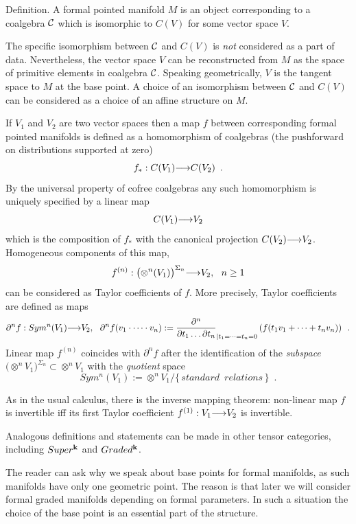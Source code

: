   \proclaim Definition. A formal pointed manifold $M$ is an
   object corresponding
   to a coalgebra ${\cal C}$ which is
   isomorphic to $C(V)$ for some vector space
    $V$.
   \par
   
   The specific isomorphism between ${\cal C}$
    and $C(V)$ is {\it not} considered as a part of data.
    Nevertheless, the vector space $V$ can be reconstructed from $M$
    as the space of primitive elements in coalgebra 
    ${\cal C}$.
      Speaking geometrically, $V$ is  the tangent space to $M$
     at the base point.
      A choice of an isomorphism between ${\cal C}$
    and $C(V)$ can be considered as a choice of an affine structure on $M$.
  
 If $V_1$ and $V_2$ are two vector spaces then a map $f$ between corresponding
  formal pointed manifolds is defined as a homomorphism of coalgebras
   (the pushforward on distributions supported at zero)
    $$f_*:C(V_1){\longrightarrow} C(V_2)\,\,\,.$$
    By the universal property of cofree coalgebras any such homomorphism
     is uniquely specified by a linear map
      $$C(V_1){\longrightarrow} V_2$$ 
      which is the composition of $f_*$ with the canonical projection
       $C(V_2){\longrightarrow} V_2$. Homogeneous components 
       of this map,
       $$f^{(n)}:
       \bigl(\otimes^n(V_1)\bigr)^{\Sigma_n}{\longrightarrow} V_2,\,\,\,\,n\ge 1$$
         can be considered
       as Taylor coefficients of $f$. More precisely, Taylor coefficients
        are defined as maps 
        $$\partial ^n f: Sym^n(V_1){\longrightarrow} V_2,
        \,\,\,\,\partial ^n f(v_1\cdot\dots\cdot v_n):=
        {{\partial}^n\over {\partial} t_1\dots {\partial} t_n}
    _{|t_1=\dots=t_n=0} \left(f(t_1 v_1+\dots+t_n v_n)\right)\,\,\,.$$
    Linear map $f^{(n)}$ coincides with $\partial ^n f$ after the
     identification of the {\it subspace}
      $\bigl( \otimes^n V_1\bigr)^{\Sigma_n}\subset \otimes^n V_1$ 
      with the {\it quotient} space 
      $$Sym^n(V_1):= \otimes ^n 
  V_1/\{\,standard\,\,\,relations\,\}\,\,\,.$$ 
     
       
       As in the usual calculus, there is the inverse mapping theorem:
     non-linear map $f$ is invertible iff its first Taylor coefficient 
     $f^{(1)}:V_1{\longrightarrow} V_2$ is invertible.
     
     Analogous definitions and statements can be made in other tensor 
     categories, including  $Super^{{\bf k}}$ and $Graded^{{\bf k}}$. 
     
      The reader can ask why we speak about  base points
     for formal  manifolds, as such manifolds
      have only one geometric point. The reason is that later we
      will consider formal graded
       manifolds
       depending on formal parameters. In such a situation
         the choice of the base point
        is an essential part of the structure.



